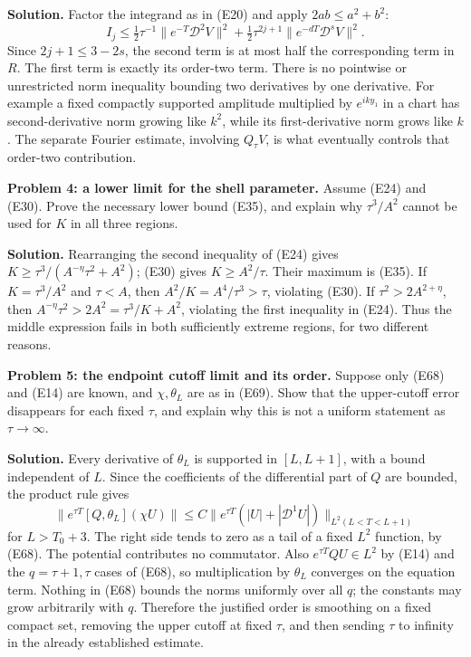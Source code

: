 \documentclass[
  11pt,
]{article}
\begin{document}
\textbf{Solution.} Factor the integrand as in (E20) and apply
\(2ab\leq a^2+b^2\): \[
 I_j\leq\tfrac12\tau^{-1}\|e^{-T}\mathcal D^2V\|^2
       +\tfrac12\tau^{2j+1}\|e^{-dT}\mathcal D^sV\|^2.
\] Since \(2j+1\leq3-2s\), the second term is at most half the
corresponding term in \(R\). The first term is exactly its order-two
term. There is no pointwise or unrestricted norm inequality bounding two
derivatives by one derivative. For example a fixed compactly supported
amplitude multiplied by \(e^{iky_1}\) in a chart has second-derivative
norm growing like \(k^2\), while its first-derivative norm grows like
\(k\). The separate Fourier estimate, involving \(Q_\tau V\), is what
eventually controls that order-two contribution.

\textbf{Problem 4: a lower limit for the shell parameter.} Assume (E24)
and (E30). Prove the necessary lower bound (E35), and explain why
\(\tau^3/A^2\) cannot be used for \(K\) in all three regions.

\textbf{Solution.} Rearranging the second inequality of (E24) gives
\(K\geq\tau^3/(A^{-\eta}\tau^2+A^2)\); (E30) gives \(K\geq A^2/\tau\).
Their maximum is (E35). If \(K=\tau^3/A^2\) and \(\tau<A\), then
\(A^2/K=A^4/\tau^3>\tau\), violating (E30). If \(\tau^2>2A^{2+\eta}\),
then \(A^{-\eta}\tau^2>2A^2=\tau^3/K+A^2\), violating the first
inequality in (E24). Thus the middle expression fails in both
sufficiently extreme regions, for two different reasons.

\textbf{Problem 5: the endpoint cutoff limit and its order.} Suppose
only (E68) and (E14) are known, and \(\chi,\theta_L\) are as in (E69).
Show that the upper-cutoff error disappears for each fixed \(\tau\), and
explain why this is not a uniform statement as \(\tau\to\infty\).

\textbf{Solution.} Every derivative of \(\theta_L\) is supported in
\([L,L+1]\), with a bound independent of \(L\). Since the coefficients
of the differential part of \(Q\) are bounded, the product rule gives \[
 \|e^{\tau T}[Q,\theta_L](\chi U)\|
    \leq C\|e^{\tau T}(|U|+|\mathcal D^1U|)\|_{L^2(L<T<L+1)}
\] for \(L>T_0+3\). The right side tends to zero as a tail of a fixed
\(L^2\) function, by (E68). The potential contributes no commutator.
Also \(e^{\tau T}QU\in L^2\) by (E14) and the \(q=\tau+1,\tau\) cases of
(E68), so multiplication by \(\theta_L\) converges on the equation term.
Nothing in (E68) bounds the norms uniformly over all \(q\); the
constants may grow arbitrarily with \(q\). Therefore the justified order
is smoothing on a fixed compact set, removing the upper cutoff at fixed
\(\tau\), and then sending \(\tau\) to infinity in the already
established estimate.
\end{document}
